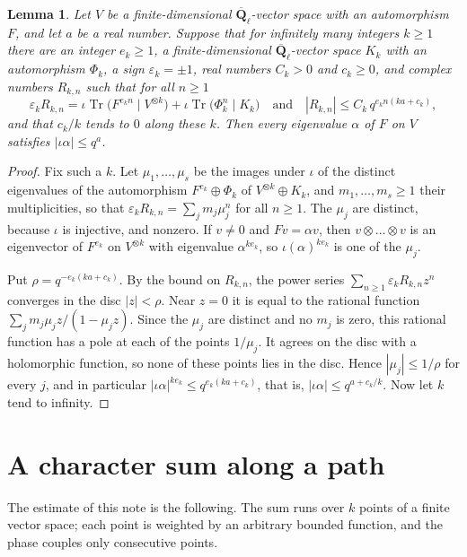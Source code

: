 \documentclass[11pt,a4paper]{article}
\theoremstyle{plain}
\newtheorem{lemma}[theorem]{Lemma}
\theoremstyle{remark}
\newcommand{\Ql}{\overline{\mathbf Q}_\ell}
\newcommand{\Tr}{\operatorname{Tr}}
\begin{document}
\begin{lemma}\label{lem:tensor}
Let $V$ be a finite-dimensional $\Ql$-vector space with an automorphism $F$, and let $a$ be a real number. Suppose
that for infinitely many integers $k\ge1$ there are an integer $e_k\ge1$, a finite-dimensional $\Ql$-vector space
$K_k$ with an automorphism $\Phi_k$, a sign $\varepsilon_k=\pm1$, real numbers $C_k>0$ and $c_k\ge0$, and complex
numbers $R_{k,n}$ such that for all $n\ge1$
\[
\varepsilon_kR_{k,n}=\iota\Tr\bigl(F^{e_kn}\mid V^{\otimes k}\bigr)+\iota\Tr\bigl(\Phi_k^n\mid K_k\bigr)
\quad\text{and}\quad|R_{k,n}|\le C_k\,q^{e_kn(ka+c_k)},
\]
and that $c_k/k$ tends to $0$ along these $k$. Then every eigenvalue $\alpha$ of $F$ on $V$ satisfies
$|\iota\alpha|\le q^a$.
\end{lemma}

\begin{proof}
Fix such a $k$. Let $\mu_1,\dots,\mu_s$ be the images under $\iota$ of the distinct eigenvalues of the automorphism
$F^{e_k}\oplus\Phi_k$ of $V^{\otimes k}\oplus K_k$, and $m_1,\dots,m_s\ge1$ their multiplicities, so that
$\varepsilon_kR_{k,n}=\sum_jm_j\mu_j^n$ for all $n\ge1$. The $\mu_j$ are distinct, because $\iota$ is injective, and
nonzero. If $v\ne0$ and $Fv=\alpha v$, then $v\otimes\dots\otimes v$ is an eigenvector of $F^{e_k}$ on
$V^{\otimes k}$ with eigenvalue $\alpha^{ke_k}$, so $\iota(\alpha)^{ke_k}$ is one of the $\mu_j$.

Put $\rho=q^{-e_k(ka+c_k)}$. By the bound on $R_{k,n}$, the power series $\sum_{n\ge1}\varepsilon_kR_{k,n}z^n$
converges in the disc $|z|<\rho$. Near $z=0$ it is equal to the rational function $\sum_jm_j\mu_jz/(1-\mu_jz)$.
Since the $\mu_j$ are distinct and no $m_j$ is zero, this rational function has a pole at each of the points
$1/\mu_j$. It agrees on the disc with a holomorphic function, so none of these points lies in the disc. Hence
$|\mu_j|\le1/\rho$ for every $j$, and in particular $|\iota\alpha|^{ke_k}\le q^{e_k(ka+c_k)}$, that is,
$|\iota\alpha|\le q^{a+c_k/k}$. Now let $k$ tend to infinity.
\end{proof}

\section{A character sum along a path}\label{sec:parseval}

The estimate of this note is the following. The sum runs over $k$ points of a finite vector space; each point is
weighted by an arbitrary bounded function, and the phase couples only consecutive points.
\end{document}

